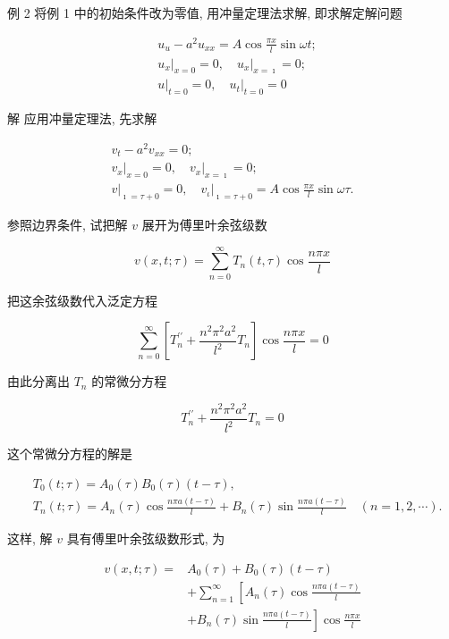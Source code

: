 例 2 将例 1 中的初始条件改为零值, 用冲量定理法求解, 即求解定解问题

$$
\begin{aligned}
& u_{u}-a^{2} u_{x x}=A \cos \frac{\pi x}{l} \sin \omega t ; \\
& \left.u_{x}\right|_{x=0}=0,\left.\quad u_{x}\right|_{x=\imath}=0 ; \\
& \left.u\right|_{t=0}=0,\left.\quad u_{t}\right|_{t=0}=0
\end{aligned}
$$

解 应用冲量定理法, 先求解

$$
\begin{gathered}
v_{t}-a^{2} v_{x x}=0 ; \\
\left.v_{x}\right|_{x=0}=0,\left.\quad v_{x}\right|_{x=\imath}=0 ; \\
\left.v\right|_{\imath=\tau+0}=0,\left.\quad v_{\iota}\right|_{\imath=\tau+0}=A \cos \frac{\pi x}{l} \sin \omega \tau .
\end{gathered}
$$

参照边界条件, 试把解 $v$ 展开为傅里叶余弦级数

$$
v(x, t ; \tau)=\sum_{n=0}^{\infty} T_{n}(t, \tau) \cos \frac{n \pi x}{l}
$$

把这余弦级数代入泛定方程

$$
\sum_{n=0}^{\infty}\left[T_{n}^{\prime \prime}+\frac{n^{2} \pi^{2} a^{2}}{l^{2}} T_{n}\right] \cos \frac{n \pi x}{l}=0
$$

由此分离出 $T_{n}$ 的常微分方程

$$
T_{n}^{\prime \prime}+\frac{n^{2} \pi^{2} a^{2}}{l^{2}} T_{n}=0
$$

这个常微分方程的解是

$$
\begin{aligned}
& T_{0}(t ; \tau)=A_{0}(\tau) B_{0}(\tau)(t-\tau), \\
& T_{n}(t ; \tau)=A_{n}(\tau) \cos \frac{n \pi a(t-\tau)}{l}+B_{n}(\tau) \sin \frac{n \pi a(t-\tau)}{l} \quad(n=1,2, \cdots) .
\end{aligned}
$$

这样, 解 $v$ 具有傅里叶余弦级数形式, 为

$$
\begin{aligned}
v(x, t ; \tau)= & A_{0}(\tau)+B_{0}(\tau)(t-\tau) \\
& +\sum_{n=1}^{\infty}\left[A_{n}(\tau) \cos \frac{n \pi a(t-\tau)}{l}\right. \\
& \left.+B_{n}(\tau) \sin \frac{n \pi a(t-\tau)}{l}\right] \cos \frac{n \pi x}{l}
\end{aligned}
$$

